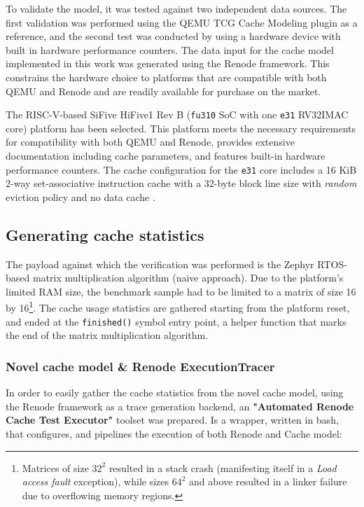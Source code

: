 To validate the model, it was tested against two independent data sources. The first validation was performed using the QEMU TCG Cache Modeling plugin as a reference, and the
second test was conducted by using a hardware device with built in hardware performance counters. The data input for the cache model implemented in this work was generated using
the Renode framework. This constrains the hardware choice to platforms that are compatible with both QEMU and Renode and are readily available for purchase on the market.

The RISC-V-based SiFive HiFive1 Rev B (\texttt{fu310} SoC with one \texttt{e31} RV32IMAC core) platform has been selected. This platform meets the necessary requirements for
compatibility with both QEMU and Renode, provides extensive documentation including cache parameters, and features built-in hardware performance counters.
The cache configuration for the \texttt{e31} core includes a 16 KiB 2-way set-associative instruction cache with a 32-byte block line size with \textit{random} eviction policy and
no data cache \cite{fe310docs}.

\subsection{Generating cache statistics} \label{sec:gencachestats}

The payload against which the verification was performed is the Zephyr RTOS-based matrix multiplication algorithm (naive approach). Due to the
platform's limited RAM size, the benchmark sample had to be limited to a matrix of size 16 by 16\footnote{Matrices of size $32^2$ resulted in a stack crash (manifesting itself in
a \textit{Load access fault} exception), while sizes $64^2$ and above resulted in a linker failure due to overflowing memory regions.}. The cache usage statistics are gathered
starting from the platform reset, and ended at the \texttt{finished()} symbol entry point, a helper function that marks the end of the matrix multiplication algorithm.\label{snip:measurement_window}

\subsubsection{Novel cache model \& Renode ExecutionTracer} %
In order to easily gather the cache statistics from the novel cache model, using the Renode framework as a trace generation backend, an \textbf{"Automated Renode Cache Test Executor"} %
toolset was prepared. Is a wrapper, written in bash, that configures, and pipelines the execution of both Renode and Cache model: %


